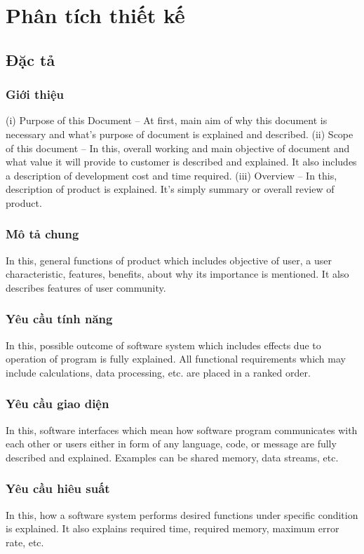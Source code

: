 \documentclass{report}
\begin{document}
\part{Phân tích thiết kế}
\chapter{Đặc tả}
\section{Giới thiệu}
(i) Purpose of this Document –
At first, main aim of why this document is necessary and what’s purpose of document is explained and described.
(ii) Scope of this document –
In this, overall working and main objective of document and what value it will provide to customer is described and explained. It also includes a description of development cost and time required.
(iii) Overview –
In this, description of product is explained. It’s simply summary or overall review of product.


\section{Mô tả chung}
In this, general functions of product which includes objective of user, a user characteristic, features, benefits, about why its importance is mentioned. It also describes features of user community.


\section{Yêu cầu tính năng}
In this, possible outcome of software system which includes effects due to operation of program is fully explained. All functional requirements which may include calculations, data processing, etc. are placed in a ranked order.


\section{Yêu cầu giao diện}
In this, software interfaces which mean how software program communicates with each other or users either in form of any language, code, or message are fully described and explained. Examples can be shared memory, data streams, etc.


\section{Yêu cầu hiêu suất}
In this, how a software system performs desired functions under specific condition is explained. It also explains required time, required memory, maximum error rate, etc.
\end{document}
